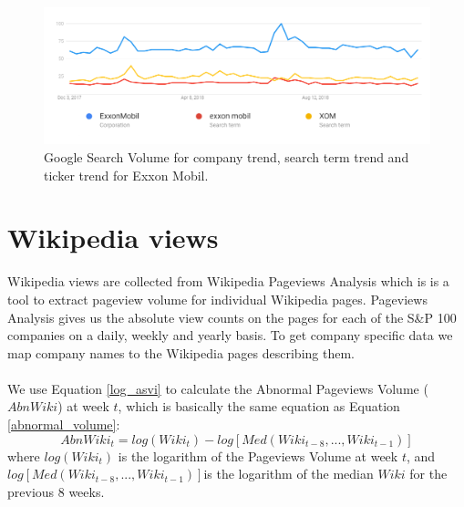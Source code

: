 \begin{figure}[h!]
  \centering
    \includegraphics[width=1\textwidth]{fig/xomStatisticsGoogleTrendsAddedExplanation.png}
 \caption{Google Search Volume for company trend, search term trend and ticker trend for Exxon Mobil.}
\label{fig:xomStatisticsGoogleTrends}
\end{figure}

\section{Wikipedia views}

Wikipedia views are collected from Wikipedia Pageviews Analysis which is is a tool to extract pageview volume for individual Wikipedia pages. Pageviews Analysis gives us the absolute view counts on the pages for each of the S\&P 100 companies on a daily, weekly and yearly basis. To get company specific data we map company names to the Wikipedia pages describing them.
\\\\
We use Equation \eqref{log_asvi} to calculate the Abnormal Pageviews Volume ($AbnWiki$) at week $t$, which is basically the same equation as Equation \eqref{abnormal_volume}:
\begin{equation}
   \label{abnormal_pageviews_volume} 
   AbnWiki_{t} = log(Wiki_{t}) - log[Med(Wiki_{t-8},...,Wiki_{t-1})] 
\end{equation}
   where $log(Wiki_{t})$ is the logarithm of the Pageviews Volume at week $t$, and $log[Med(Wiki_{t-8},...,Wiki_{t-1})]$is the logarithm of the median $Wiki$ for the previous 8 weeks.
